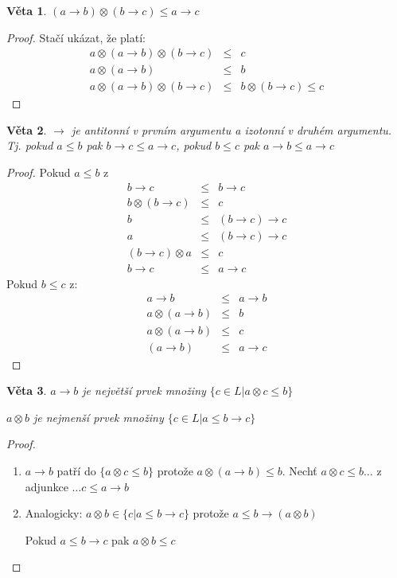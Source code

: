 \documentclass[10pt, a4paper, titlepage]{article}
\theoremstyle{note}
\newtheorem{veta}{Věta}
\begin{document}
\begin{veta}
$(a\rightarrow b) \otimes (b\rightarrow c)\leq a\rightarrow c$
\end{veta}
\begin{proof}
Stačí ukázat, že platí: \begin{eqnarray} a\otimes(a\rightarrow b)\otimes(b\rightarrow c)&\leq& c\nonumber\\
	      a\otimes(a\rightarrow b)&\leq&b\nonumber\\
	      a\otimes(a\rightarrow b)\otimes(b\rightarrow c)&\leq&b\otimes(b\rightarrow c) \leq c\nonumber
  \end{eqnarray}
\end{proof}
\begin{veta}
$\rightarrow$ je antitonní v prvním argumentu a izotonní v druhém argumentu. Tj. pokud $a\leq b$ pak $b\rightarrow c \leq a\rightarrow c$, pokud $b\leq c$ pak $a\rightarrow b\leq a\rightarrow c$
\end{veta}
\begin{proof}
Pokud $a\leq b$ z \begin{eqnarray} b\rightarrow c&\leq& b\rightarrow c\nonumber\\
				 b\otimes (b\rightarrow c)&\leq& c\nonumber\\
				 b &\leq& (b\rightarrow c)\rightarrow c\nonumber\\
				 a &\leq& (b\rightarrow c)\rightarrow c\nonumber\\
				 (b\rightarrow c)\otimes a &\leq&  c\nonumber\\
				 b\rightarrow c &\leq&  a \rightarrow c\nonumber
\end{eqnarray}
Pokud $b\leq c$ z:\begin{eqnarray}a\rightarrow b &\leq&a\rightarrow b \nonumber\\
				  a\otimes (a\rightarrow b) &\leq& b \nonumber\\
				  a\otimes (a\rightarrow b) &\leq& c \nonumber\\
				  (a\rightarrow b) &\leq& a\rightarrow c \nonumber
\end{eqnarray}
\end{proof}
\begin{veta}\label{v9}
$a\rightarrow b$ je největší prvek množiny $\{c\in L | a\otimes c\leq b\}$

\hspace{1.45cm}$a\otimes b$ je nejmenší prvek množiny $\{c\in L | a\leq b\rightarrow c\}$
\end{veta}
\begin{proof}
\begin{enumerate}
\item $a\rightarrow b$ patří do $\{a\otimes c\leq b\}$ protože $a\otimes(a\rightarrow b)\leq b$.
  Nechť $a\otimes c \leq b\dots$ z adjunkce $\dots c\leq a\rightarrow b$

\item Analogicky: $a\otimes b \in \{ c| a\leq b\rightarrow c\}$ protože $a\leq b\rightarrow(a\otimes b)$

Pokud $a\leq b\rightarrow c$ pak $a\otimes b\leq c$
\end{enumerate}
\end{proof}
\end{document}
